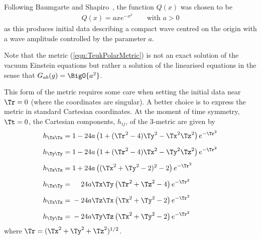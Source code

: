 \documentclass[a4paper,12pt]{article}
\numberwithin{equation}{section}
\begin{document}
Following Baumgarte and Shapiro~\cite{baumgarte:1998-01}, the function $Q(x)$ was chosen to
be
\begin{align}
   Q(x) = a x e^{-x^2}\qquad\text{with } a > 0
   \label{eqn:funQ}
\end{align}
as this produces initial data describing a compact wave centred on the origin with a wave
amplitude controlled by the parameter $a$.

Note that the metric (\ref{eqn:TeukPolarMetric}) is not an exact solution of the vacuum
Einstein equations but rather a solution of the linearised equations in the sense that
$G_{ab}(g) = \BigO{a^2}$.

This form of the metric requires some care when setting the initial data near $\Tr=0$ (where
the coordinates are singular). A better choice is to express the metric in standard Cartesian
coordinates. At the moment of time symmetry, $\Tt=0$, the Cartesian components, $h_{ij}$, of
the 3-metric are given by
\bgroup
\def\P{\phantom{{}+{}}}
\def\M{{}-{}}
\begin{align}
   h_{\Tx\Tx}&=1 - 24 a \left( 1+(\Tr^2-4) \Ty^2-\Tx^2 \Tz^2 \right)
              e^{-\Tr^2}\label{eqn:hxx}\\[5pt]
   h_{\Ty\Ty}&=1 - 24 a \left( 1+(\Tr^2-4) \Tx^2-\Ty^2 \Tz^2 \right)
              e^{-\Tr^2}\label{eqn:hyy}\\[5pt]
   h_{\Tz\Tz}&=1 + 24 a \left( (\Tx^2 + \Ty^2 - 2)^2 - 2 \right)
              e^{-\Tr^2}\label{eqn:hzz}\\[5pt]
   h_{\Tx\Ty}&=\P24 a \Tx \Ty \left( \Tr^2 + \Tz^2 - 4 \right)
              e^{-\Tr^2}\label{eqn:hxy}\\[5pt]
   h_{\Tx\Tz}&=\M24 a \Tz \Tx \left( \Tx^2 + \Ty^2 - 2 \right)
              e^{-\Tr^2}\label{eqn:hxz}\\[5pt]
   h_{\Ty\Tz}&=\M24 a \Ty \Tz \left( \Tx^2 + \Ty^2 - 2 \right)
              e^{-\Tr^2}\label{eqn:hyz}
\end{align}
\egroup
where $\Tr=(\Tx^2+\Ty^2+\Tz^2)^{1/2}$.
\end{document}
